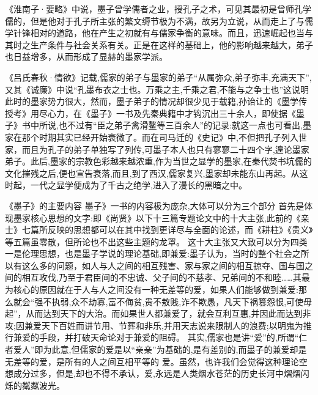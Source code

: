 \documentclass[12pt,UTF8]{ctexbook}
\begin{document}
《淮南子·要略》中说，墨子曾学儒者之业，授孔子之术，可见其最初是曾师孔学儒的，但是他对于孔子所主张的繁文缛节极为不满，故另为立说，从而走上了与儒学针锋相对的道路，他在产生之初就有与儒家争衡的意味。而且，迅速崛起也当与其时之生产条件与社会关系有关。正是在这样的基础上，他的影响越来越大，弟子也日益增多，从而形成了显赫的墨家学派。

《吕氏春秋·情欲》记载,儒家的弟子与墨家的弟子“从属弥众,弟子弥丰,充满天下”,又其《诚廉》中说“孔墨布衣之士也。万乘之主,千乘之君,不能与之争士也”这说明此时的墨家势力很大，然而，墨子弟子的情况却很少见于载籍,孙诒让的《墨学传授考》用尽心力，在《墨子》一书及先秦典籍中才钩沉出三十余人，即使据《墨子》书中所说,也不过有“臣之弟子禽滑鳌等三百余人”的记录:就这一点也可看出,墨家在那个时期其实已经开始衰微了。而在司马迁的《史记》中,不但把孔子列入世家，而且为孔子的弟子单独写了列传,可墨子本人也只有寥寥二十四个字,遑论墨家弟子。此后,墨家的宗教色彩越来越浓重,作为当世之显学的墨家,在秦代焚书坑儒的文化摧残之后,便也宣告衰落,而且,到了西汉,儒家复兴,墨家却未能东山再起。从这时起，一代之显学便成为了千古之绝学,进入了漫长的黑暗之中。

《墨子》的主要内容
墨子》一书的内容极为庞杂,大体可以分为三个部分
首先是体现墨家核心思想的文字:即《尚贤》以下十三篇专题论文中的十大主张,此前的《亲士》七篇所反映的思想都可以在其中找到更详尽与全面的论述，而《耕柱》《贵义》等五篇虽零散，但所论也不出这些主题的龙罩。
这十大主张又大致可以分为四类
一是伦理思想，也是墨子学说的理论基础,即兼爱:墨子认为，当时的整个社会之所以有这么多的问题，如人与人之间的相互残害、家与家之间的相互掠夺、国与国之间的相互攻伐,乃至于君臣间的不忠诚、父子间的不慈孝、兄弟间的不和睦……其最为核心的原因就在于人与人之间没有一种无差等的爱，如果人们能够做到兼爱:那么就会“强不执弱,众不劫寡,富不侮贫,贵不敖贱,诈不欺愚，凡天下祸篡怨恨,可使毋起”，从而达到天下的大治。而如果世人都兼爱了，就会互利互惠,并因此而达到非攻;因兼爱天下百姓而讲节用、节葬和非乐,并用天志说来限制人的浪费;以明鬼为推行兼爱的手段，并打破天命论对于兼爱的阻碍。
其实,儒家也是讲“爱”的,所谓“仁者爱人”即为此意,但儒家的爱是以“亲亲”为基础的,是有差别的,而墨子的兼爱却是无差等的爱，是所有的人之间互相平等的
爱。虽然，也许我们会觉得这种理论空想成分过多，但是,却也不得不承认，爱,永远是人类烟水苍茫的历史长河中熠熠闪烁的粼粼波光。
\end{document}
